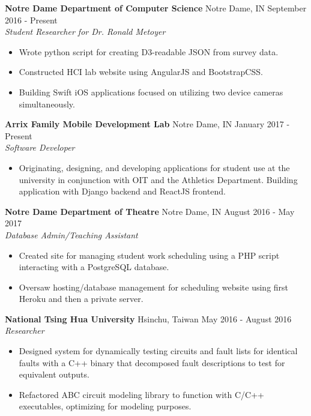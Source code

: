 \documentclass[9pt]{article}
\begin{document}
    \textbf{Notre Dame Department of Computer Science}
    \hfill
    Notre Dame, IN
    \hfill
    September 2016 - Present
    \\
    \textit{Student Researcher for Dr. Ronald Metoyer}
    \begin{itemize}
      \item Wrote python script for creating D3-readable JSON from survey data.
      \item Constructed HCI lab website using AngularJS and BootstrapCSS.
      \item Building Swift iOS applications focused on utilizing two device cameras simultaneously.
    \end{itemize}
    
    \textbf{Arrix Family Mobile Development Lab}
    \hfill
    Notre Dame, IN
    \hfill
    January 2017 - Present
    \\
    \textit{Software Developer}
    \begin{itemize}
      \item Originating, designing, and developing applications for student use at the university in conjunction with OIT and the Athletics Department. Building application with Django backend and ReactJS frontend.
    \end{itemize}
    
    \textbf{Notre Dame Department of Theatre}
    \hfill
    Notre Dame, IN  
    \hfill
    August 2016 - May 2017
    \\
    \textit{Database Admin/Teaching Assistant}
    \begin{itemize}
      \item Created site for managing student work scheduling using a PHP script interacting with a PostgreSQL database.
      \item Oversaw hosting/database management for scheduling website using first Heroku and then a private server.
    \end{itemize}
    
    \textbf{National Tsing Hua University}
    \hfill
    Hsinchu, Taiwan
    \hfill
    May 2016 - August 2016
    \\
    \textit{Researcher}
    \begin{itemize}
      \item Designed system for dynamically testing circuits and fault lists for identical faults with a C++ binary that decomposed fault descriptions to test for equivalent outputs.
      \item Refactored ABC circuit modeling library to function with C/C++ executables, optimizing for modeling purposes.
    \end{itemize}
    
\end{document}
